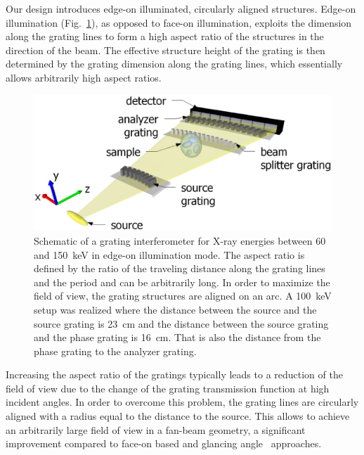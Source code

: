 \documentclass[english]{nature}
\begin{document}
Our design introduces edge-on illuminated,  circularly aligned structures. Edge-on illumination
(Fig.~\ref{Fig:schematic}), as
opposed to face-on illumination, exploits the dimension along the grating
lines to form a high aspect ratio of the structures in the direction of the beam. The
effective structure height of the grating is then determined by the grating
dimension along the grating lines, which essentially allows arbitrarily high
aspect ratios. 
\begin{figure}[h!]
    \centering
    \includegraphics[width=.7\textwidth]{figures/figure1.eps}
    \caption{Schematic of a grating
        interferometer for X-ray energies between 60 and
        \SI{150}{\kilo\electronvolt} in edge-on illumination mode. The
        aspect ratio is defined by the ratio of the traveling distance along the
        grating lines and the period and can be arbitrarily long. In order to maximize
        the field of view, the grating structures are aligned on an
        arc. A \SI{100}{\kilo\eV} setup was realized where the distance
        between the source and the source grating is \SI{23}{\centi\metre}
    and the distance between the source grating and the phase grating is
    \SI{16}{\centi\metre}. That is also the distance from the phase grating
to the analyzer grating.}%
\label{Fig:schematic}
\end{figure}

Increasing the aspect ratio of the gratings typically leads to a
reduction of the field of view due to the change of the grating transmission
function at high incident angles. In order to overcome this problem, the grating lines are circularly aligned 
with a radius equal to the distance to the source. 
This allows to achieve an arbitrarily large field of view in a fan-beam
geometry, a significant improvement compared to face-on based and glancing
angle~\cite{Stutman2012a} approaches.
\end{document}
